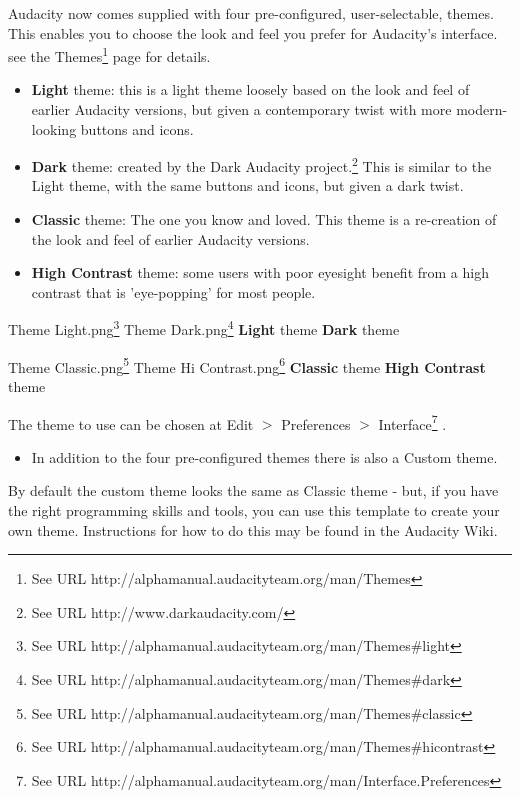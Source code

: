 Audacity now comes supplied with four pre-configured, user-selectable, themes.  This enables you to choose the look and feel you prefer for Audacity's interface. see the Themes\footnote{See URL http://alphamanual.audacityteam.org/man/Themes} page for details.
\begin{itemize}
\item \textbf{Light} theme: this is a light theme loosely based on the look and feel of earlier Audacity versions, but given a contemporary twist with more modern-looking buttons and icons. 
\item \textbf{Dark} theme: created by the Dark Audacity project.\footnote{See URL http://www.darkaudacity.com/} This is similar to the Light theme, with the same buttons and icons, but given a dark twist.
\item \textbf{Classic} theme: The one you know and loved. This theme is a re-creation of the look and feel of earlier Audacity versions. 
\item \textbf{High Contrast} theme: some users with poor eyesight benefit from a high contrast that is 'eye-popping' for most people.
\end{itemize}

\* \* \* \* Theme Light.png\footnote{See URL http://alphamanual.audacityteam.org/man/Themes\#light}
\* \* \* \* Theme Dark.png\footnote{See URL http://alphamanual.audacityteam.org/man/Themes\#dark}
\* \* \* \* 
\textbf{Light} theme
\* \* \* \* 
\textbf{Dark} theme

\* \* \* \* Theme Classic.png\footnote{See URL http://alphamanual.audacityteam.org/man/Themes\#classic}
\* \* \* \* Theme Hi Contrast.png\footnote{See URL http://alphamanual.audacityteam.org/man/Themes\#hicontrast}
\* \* \* \* 
\textbf{Classic} theme
\* \* \* \* 
\textbf{High Contrast} theme


The theme to use can be chosen at 
Edit \mbox{$>$} Preferences \mbox{$>$} Interface\footnote{See URL http://alphamanual.audacityteam.org/man/Interface.Preferences}
.  
\begin{itemize}
\item  In addition to the four pre-configured themes there is also a Custom theme.  
\end{itemize}

By default the custom theme looks the same as Classic theme - but, if you have the right programming skills and tools, you can use this template to create your own theme.  Instructions for how to do this may be found in the Audacity Wiki.




